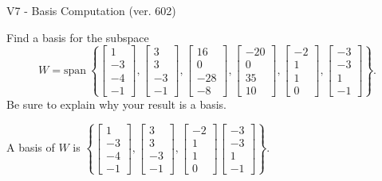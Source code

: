 \begin{exercise}
  \begin{exerciseTitle}V7 - Basis Computation (ver. 602)\end{exerciseTitle}
  \begin{exerciseStatement}
    Find a basis for the subspace 
\[W=\mathrm{span}\ \left\{\left[\begin{array}{r}
1 \\
-3 \\
-4 \\
-1
\end{array}\right] , \left[\begin{array}{r}
3 \\
3 \\
-3 \\
-1
\end{array}\right] , \left[\begin{array}{r}
16 \\
0 \\
-28 \\
-8
\end{array}\right] , \left[\begin{array}{r}
-20 \\
0 \\
35 \\
10
\end{array}\right] , \left[\begin{array}{r}
-2 \\
1 \\
1 \\
0
\end{array}\right] , \left[\begin{array}{r}
-3 \\
-3 \\
1 \\
-1
\end{array}\right]\right\}.\]
 Be sure to explain why your result is a basis.


  \end{exerciseStatement}
  \begin{exerciseAnswer}
   A basis of \(W\) is  \(\left\{\left[\begin{array}{r}
1 \\
-3 \\
-4 \\
-1
\end{array}\right] , \left[\begin{array}{r}
3 \\
3 \\
-3 \\
-1
\end{array}\right] , \left[\begin{array}{r}
-2 \\
1 \\
1 \\
0
\end{array}\right] \left[\begin{array}{r}
-3 \\
-3 \\
1 \\
-1
\end{array}\right]\right\}\).
  


  \end{exerciseAnswer}
\end{exercise}